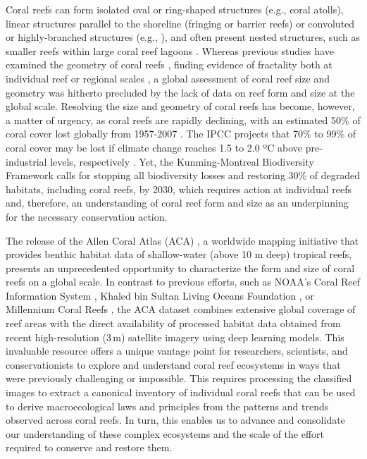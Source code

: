 Coral reefs can form isolated oval or ring-shaped structures (e.g., coral
atolls), linear structures parallel to the shoreline (fringing or barrier
reefs) or convoluted or highly-branched structures (e.g., \cite{Purkis2007}),
and often present nested structures, such as smaller reefs within large coral
reef lagoons \cite{Bradbury1983}. Whereas previous studies have examined the
geometry of coral reefs \cite{Bradbury1983,Purkis2007,
    Zawada2009,Alvarez_Filip2009,Bozec2015, Sous2020}, finding evidence of
fractality both at individual reef \cite{Bradbury1983,Sous2020} or regional
scales \cite{Purkis2007, Zawada2009}, a global assessment of coral reef size
and geometry was hitherto precluded by the lack of data on reef form and size
at the global scale. Resolving the size and geometry of coral reefs has become,
however, a matter of urgency, as coral reefs are rapidly declining, with an
estimated 50\% of coral cover lost globally from 1957-2007
\cite{eddy2021global}. The IPCC projects that 70\% to 99\% of coral cover may
be lost if climate change reaches 1.5 to 2.0 ºC above pre-industrial levels,
respectively \cite{bindoff2019changing}. Yet, the Kunming-Montreal Biodiversity
Framework \cite{kunming-montreal-framework} calls for stopping all biodiversity
losses and restoring 30\% of degraded habitats, including coral reefs, by 2030,
which requires action at individual reefs and, therefore, an understanding of
coral reef form and size as an underpinning for the necessary conservation
action.

The release of the Allen Coral Atlas (ACA) \cite{allen-coral-atlas}, a
worldwide mapping initiative that provides benthic habitat data of
shallow-water (above 10 m deep) tropical reefs, presents an unprecedented
opportunity to characterize the form and size of coral reefs on a global scale.
In contrast to previous efforts, such as NOAA’s Coral Reef Information System
\cite{oconnor2020}, Khaled bin Sultan Living Oceans Foundation
\cite{globalreefexpedition2021}, or Millennium Coral Reefs \cite{unep2010}, the
ACA dataset combines extensive global coverage of reef areas with the direct
availability of processed habitat data obtained from recent high-resolution
(3\,m) satellite imagery using deep learning models. This invaluable resource
offers a unique vantage point for researchers, scientists, and conservationists
to explore and understand coral reef ecosystems in ways that were previously
challenging or impossible. This requires processing the classified images to
extract a canonical inventory of individual coral reefs that can be used to
derive macroecological laws and principles from the patterns and trends
observed across coral reefs. In turn, this enables us to advance and
consolidate our understanding of these complex ecosystems and the scale of the
effort required to conserve and restore them.

